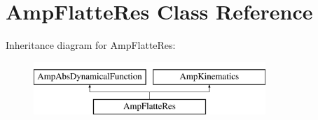 \hypertarget{class_amp_flatte_res}{\section{Amp\-Flatte\-Res Class Reference}
\label{class_amp_flatte_res}
}
Inheritance diagram for Amp\-Flatte\-Res\-:\begin{figure}[H]
\begin{center}
\leavevmode
\includegraphics[height=2.000000cm]{class_amp_flatte_res}
\end{center}
\end{figure}
